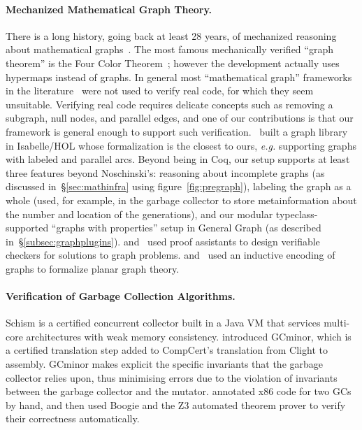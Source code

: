 \documentclass[acmsmall,screen]{acmart}
\begin{document}
\paragraph{Mechanized Mathematical Graph Theory.}
There is a long history, going back at least 28 years, of mechanized 
reasoning about mathematical graphs~\cite{wong1991}. 
The most famous mechanically verified “graph theorem” is the Four Color 
Theorem~\cite{gonthier2005computer}; however the development actually uses
hypermaps instead of graphs. In general most “mathematical graph” frameworks in 
the literature~\cite{wong1991, chou1994, yamamoto1995formalization, rwpgt1998, yamamoto1998formalization, tamai2000formal, duprat2001coq, ridge2005graphs, nipkow2016, dijkstra_shortest_path-afp} were not used to verify real 
code, for which they seem unsuitable. Verifying real code requires delicate concepts such as removing a subgraph, null nodes, and parallel edges, and one of our contributions is that our framework is general enough to support such verification. 
\citet{noschinski2015}~built a graph library in Isabelle/HOL whose formalization 
is the closest to ours, 
\emph{e.g.} supporting graphs with labeled and parallel arcs. 
Beyond being in Coq, our setup supports at least three features beyond 
Noschinski’s: reasoning about incomplete graphs (as discussed 
in~\S\ref{sec:mathinfra} using figure~\ref{fig:pregraph}), labeling the graph 
as a whole (used, for example, in the garbage collector to store 
metainformation about the number and location of the generations), and our 
modular typeclass-supported “graphs with properties” setup in General Graph 
(as described in~\S\ref{subsec:graphplugins}). 
\citet{dubois2015graphes} and \citet{noschinski2015formalizing}~used proof assistants to 
design verifiable checkers for solutions to graph problems. 
\citet{bauer20025} and \citet{yamamoto1995formalization}~used an inductive encoding of graphs to formalize planar graph theory.


\paragraph{Verification of Garbage Collection Algorithms.}
Schism \cite{gcexample4,gcexample4a} is a certified concurrent
collector built in a Java VM that services multi-core architectures with weak memory consistency.
\citet{gcexample5, gcexample3} introduced GCminor, which is
a certified translation step added to CompCert's translation from Clight to assembly.
GCminor makes explicit the specific invariants that the garbage collector
relies upon, thus minimising errors due to the violation of invariants
between the garbage collector and the mutator.
\citet{gcexample2} annotated x86 code
for two GCs by hand, and then used Boogie and the Z3 automated theorem prover
to verify their correctness automatically.
\end{document}
